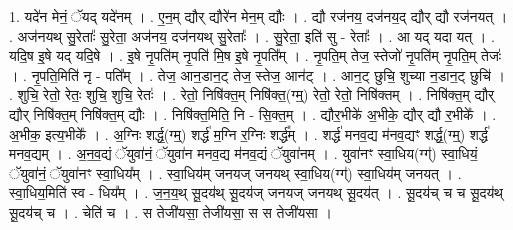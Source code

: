 \documentclass[17pt]{extarticle}
\begin{document}
1. यदे॑न मेनं॒ ॅयद् यदे॑नम् । . ए॒न॒म् द्यौर् द्यौरे॑न मेन॒म् द्यौः । . द्यौ रज॑नय॒ दज॑नय॒द् द्यौर् द्यौ रज॑नयत् । . अज॑नयथ् सु॒रेताः᳚ सु॒रेता॒ अज॑नय॒ दज॑नयथ् सु॒रेताः᳚ । . सु॒रेता॒ इति॑ सु - रेताः᳚ । . आ यद् यदा यत् । . यदि॒ष इ॒षे यद् यदि॒षे । . इ॒षे नृ॒पति॑म् नृ॒पति॑ मि॒ष इ॒षे नृ॒पति᳚म् । . नृ॒पति॒म् तेज॒ स्तेजो॑ नृ॒पति॑म् नृ॒पति॒म् तेजः॑ । . नृ॒पति॒मिति॑ नृ - पति᳚म् । . तेज॒ आन॒डान॒ट् तेज॒ स्तेज॒ आन॑ट् । . आन॒ट् छुचि॒ शुच्या न॒डान॒ट् छुचि॑ । . शुचि॒ रेतो॒ रेतः॒ शुचि॒ शुचि॒ रेतः॑ । . रेतो॒ निषि॑क्त॒म् निषि॑क्त॒(ग्म्॒) रेतो॒ रेतो॒ निषि॑क्तम् । . निषि॑क्त॒म् द्यौर् द्यौर् निषि॑क्त॒म् निषि॑क्त॒म् द्यौः । . निषि॑क्त॒मिति॒ नि - सि॒क्त॒म् । . द्यौर॒भीके॑ अ॒भीके॒ द्यौर् द्यौ र॒भीके᳚ । . अ॒भीक॒ इत्य॒भीके᳚ । . अ॒ग्निः शर्द्ध॒(ग्म्॒) शर्द्ध॑ म॒ग्नि र॒ग्निः शर्द्ध᳚म् । . शर्द्ध॑ मनव॒द्य म॑नव॒द्यꣳ शर्द्ध॒(ग्म्॒) शर्द्ध॑ मनव॒द्यम् । . अ॒न॒व॒द्यं ॅयुवा॑नं॒ ॅयुवा॑न मनव॒द्य म॑नव॒द्यं ॅयुवा॑नम् । . युवा॑नꣳ स्वा॒धिय(ग्ग्॑) स्वा॒धियं॒ ॅयुवा॑नं॒ ॅयुवा॑नꣳ स्वा॒धिय᳚म् । . स्वा॒धिय॑म् जनयज् जनयथ् स्वा॒धिय(ग्ग्॑) स्वा॒धिय॑म् जनयत् । . स्वा॒धिय॒मिति॑ स्व - धिय᳚म् । . ज॒न॒य॒थ् सू॒दय॑थ् सू॒दय॑ज् जनयज् जनयथ् सू॒दय॑त् । . सू॒दय॑च् च च सू॒दय॑थ् सू॒दय॑च् च । . चेति॑ च । . स तेजी॑यसा॒ तेजी॑यसा॒ स स तेजी॑यसा । \newline
\end{document}
